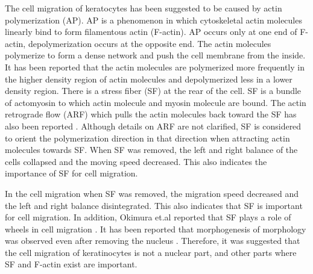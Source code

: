 \documentclass[a4paper,12pt, oneside]{book}
\begin{document}
The cell migration of keratocytes has been suggested to be caused by actin polymerization (AP)\cite{svitkina1997analysis}.
AP is a phenomenon in which cytoskeletal actin molecules linearly bind to form filamentous actin (F-actin).
AP occurs only at one end of F-actin, depolymerization occurs at the opposite end.
The actin molecules polymerize to form a dense network and push the cell membrane from the inside.
It has been reported that the actin molecules are polymerized more frequently in the higher density region of actin molecules and depolymerized less in a lower density region\cite{yumura1998spatiotemporal}.
There is a stress fiber (SF) at the rear of the cell.
SF is a bundle of actomyosin to which actin molecule and myosin molecule are bound.
The actin retrograde flow (ARF) which pulls the actin molecules back toward the SF has also been reported \cite{swaminathan2017actin}.
Although details on ARF are not clarified, SF is considered to orient the polymerization direction in that direction when attracting actin molecules towards SF\cite{nakata2016role}.
When SF was removed, the left and right balance of the cells collapsed and the moving speed decreased. This also indicates the importance of SF for cell migration.

In the cell migration when SF was removed, the migration speed decreased and the left and right balance disintegrated.
This also indicates that SF is important for cell migration.
In addition, Okimura et.al reported that SF plays a role of wheels in cell migration \cite{okimura2018rotation}.
It has been reported that morphogenesis of morphology was observed even after removing the nucleus \cite{asano2004keratocyte}.
Therefore, it was suggested that the cell migration of keratinocytes is not a nuclear part, and other parts where SF and F-actin exist are important.
\end{document}
